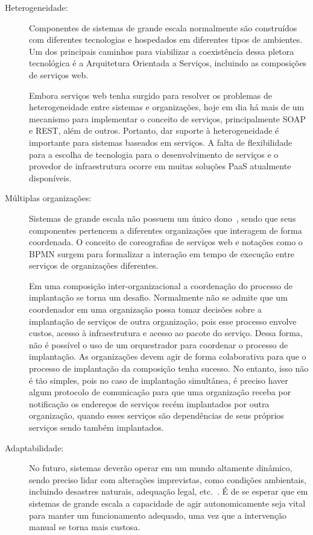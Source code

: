 \begin{description}
\item [Heterogeneidade:]

Componentes de sistemas de grande escala normalmente são construídos com diferentes tecnologias
e hospedados em diferentes tipos de ambientes.
Um dos principais caminhos para viabilizar a coexistência dessa pletora tecnológica
é a Arquitetura Orientada a Serviços, incluindo as composições de serviços web.

Embora serviços web tenha surgido para resolver os problemas de heterogeneidade
entre sistemas e organizações, hoje em dia há mais de um mecanismo para
implementar o conceito de serviços, principalmente SOAP e REST, além de outros.
Portanto, dar suporte à heterogeneidade é importante para sistemas baseados em serviços.
A falta de flexibilidade para a escolha de tecnologia para o desenvolvimento de serviços
e o provedor de infraestrutura ocorre em muitas soluções PaaS atualmente disponíveis.

\item [Múltiplas organizações:]

Sistemas de grande escala não possuem um único dono~\cite{Steen2011VeryLarge}, 
sendo que seus componentes pertencem a diferentes organizações que interagem de forma coordenada. 
O conceito de coreografias de serviços web e notações como o BPMN surgem para 
formalizar a interação em tempo de execução entre serviços de organizações diferentes.

Em uma composição inter-organizacional a coordenação do processo de implantação se torna um desafio. Normalmente não se admite que um coordenador em uma organização possa tomar decisões 
sobre a implantação de serviços de outra organização, pois esse processo envolve
custos, acesso à infraestrutura e acesso ao pacote do serviço.
Dessa forma, não é possível o uso de um orquestrador para coordenar o processo de implantação.
As organizações devem agir de forma colaborativa para que o processo de implantação
da composição tenha sucesso.
No entanto, isso não é tão simples, pois no caso de implantação simultânea,
é preciso haver algum protocolo de comunicação para que uma organização receba
por notificação os endereços de serviços recém implantados por outra organização,
quando esses serviços são dependências de seus próprios serviços sendo também implantados.

\item [Adaptabilidade:]

No futuro, sistemas deverão operar em um mundo altamente dinâmico,
sendo preciso lidar com alterações imprevistas, como condições ambientais, incluindo desastres naturais, 
adequação legal, etc.~\cite{Papazoglou2008Journey}.
É de se esperar que em sistemas de grande escala a capacidade de agir autonomicamente 
seja vital para manter um funcionamento adequado, uma vez que a intervenção manual
se torna mais custosa.


\end{description}
